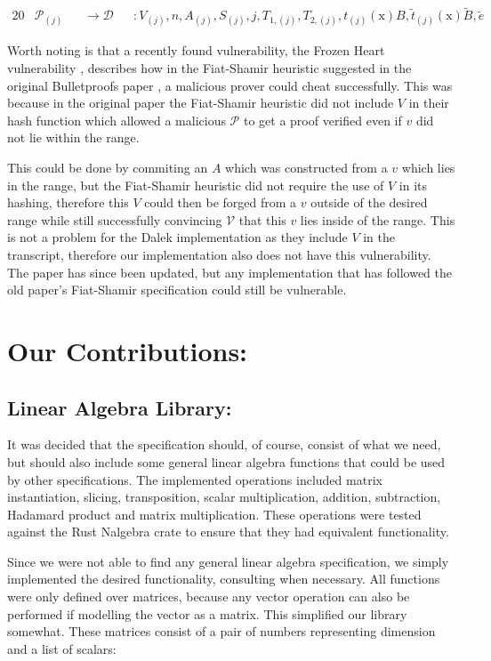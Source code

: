 \documentclass{article}
\newcommand{\eq}[1]{\begin{alignat*}{20}#1\end{alignat*}}
\newcommand{\ran}[1]{\mathrm{#1}}
\newcommand{\V}{\mathcal{V}}
\renewcommand{\P}{\mathcal{P}}
\newcommand{\D}{\mathcal{D}}
\newcommand{\blind}[1]{\widetilde{#1}}
\newcommand{\bt}{\blind{t}}
\newcommand{\bB}{\blind{B}}
\newcommand{\be}{\blind{e}}
\begin{document}
\eq{
	&\P_{(j)} &&\rightarrow \D &&: V_{(j)}, n, A_{(j)}, S_{(j)}, j, T_{1, (j)}, T_{2,(j)}, t_{(j)}(\ran{x})B, \bt_{(j)}(\ran{x})\bB, \be
}

Worth noting is that a recently found vulnerability, the Frozen
Heart vulnerability \cite{frozen-heart}, describes how in the
Fiat-Shamir heuristic suggested in the original Bulletproofs paper
\cite{bulletproofs}, a malicious prover could cheat successfully. This
was because in the original paper the Fiat-Shamir heuristic did not
include $V$ in their hash function which allowed a malicious $\P$
to get a proof verified even if $v$ did not lie within the range.

This could be done by commiting an $A$ which was constructed from
a $v$ which lies in the range, but the Fiat-Shamir heuristic did
not require the use of $V$ in its hashing, therefore this $V$
could then be forged from a $v$ outside of the desired range while
still successfully convincing $\V$ that this $v$ lies inside of the
range. This is not a problem for the Dalek implementation as they
include $V$ in the transcript, therefore our implementation also
does not have this vulnerability. The paper has since been updated,
but any implementation that has followed the old paper's Fiat-Shamir
specification could still be vulnerable.

\section{Our Contributions:} \label{our-contributions}

\subsection{Linear Algebra Library:} \label{linear-algebra-library}
It was decided that the specification should, of course, consist of what
we need, but should also include some general linear algebra functions 
that could be used by other specifications. The implemented operations 
included matrix instantiation, slicing, transposition, scalar 
multiplication, addition, subtraction, Hadamard product and matrix 
multiplication. These operations were tested against the Rust Nalgebra 
crate \cite{nalgebra} to ensure that they had equivalent functionality.

Since we were not able to find any general linear algebra
specification, we simply implemented the desired functionality,
consulting \cite{linear-algebra} when necessary. All functions were
only defined over matrices, because any vector operation can also
be performed if modelling the vector as a matrix. This simplified
our library somewhat. These matrices consist of a pair of numbers
representing dimension and a list of scalars:
\end{document}
